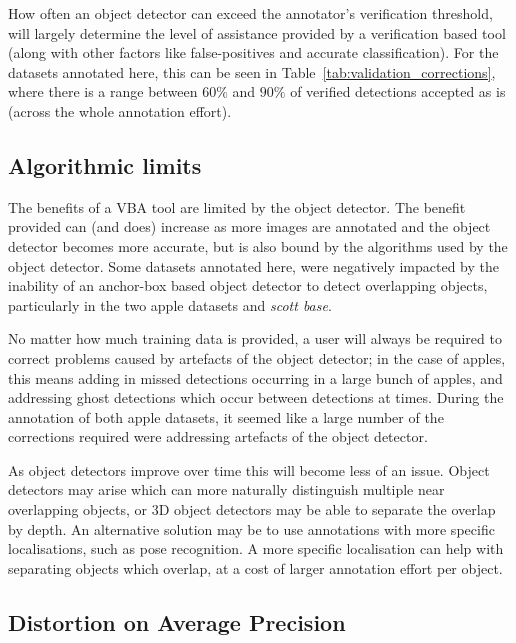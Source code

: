 How often an object detector can exceed the annotator's verification threshold, will largely determine the level of assistance provided by a verification based tool (along with other factors like false-positives and accurate classification). For the datasets annotated here, this can be seen in Table~\ref{tab:validation_corrections}, where there is a range between $60\%$ and $90\%$ of verified detections accepted as is (across the whole annotation effort). 

\subsection{Algorithmic limits}
\label{sec:machine_limits}

The benefits of a \gls{VBA} tool are limited by the object detector. The benefit provided can (and does) increase as more images are annotated and the object detector becomes more accurate, but is also bound by the algorithms used by the object detector. Some datasets annotated here, were negatively impacted by the inability of an anchor-box based object detector to detect overlapping objects, particularly in the two apple datasets and \emph{scott base}. 

No matter how much training data is provided, a user will always be required to correct problems caused by artefacts of the object detector; in the case of apples, this means adding in missed detections occurring in a large bunch of apples, and addressing ghost detections which occur between detections at times. During the annotation of both apple datasets, it seemed like a large number of the corrections required were addressing artefacts of the object detector.

As object detectors improve over time this will become less of an issue. Object detectors may arise which can more naturally distinguish multiple near overlapping objects, or 3D object detectors may be able to separate the overlap by depth. An alternative solution may be to use annotations with more specific localisations, such as pose recognition. A more specific localisation can help with separating objects which overlap, at a cost of larger annotation effort per object.


\subsection{Distortion on Average Precision}
\label{sec:distortion_precision}

